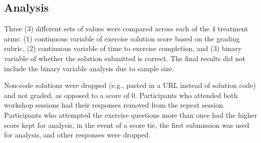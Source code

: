 \documentclass[040-assessment.tex]{subfiles}
\begin{document}
\subsection{Analysis}

    Three (3) different sets of values were compared across each of the 4 treatment arms:
    (1) continuous variable of exercise solution score based on the grading rubric,
    (2) continuous variable of time to exercise completion, and
    (3) binary variable of whether the solution submitted is correct.
    The final results did not include the binary variable analysis due to sample size.

    Non-code solutions were dropped (e.g., pasted in a URL instead of solution code)
    and not graded, as opposed to a score of 0.
    Participants who attended both workshop sessions had their responses removed from the repeat session.
    Participants who attempted the exercise questions more than once had the higher score kept for analysis,
    in the event of a score tie, the first submission was used for analysis,
    and other responses were dropped.
\end{document}
